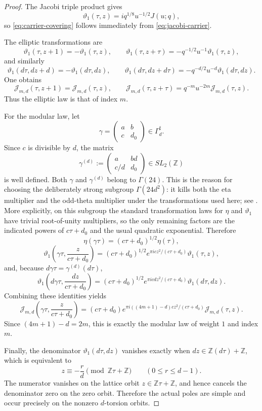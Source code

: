 \documentclass[12pt]{amsart}
\numberwithin{equation}{section}
\newcommand{\ZZ}{\mathbb Z}
\begin{document}
\begin{proof}
The Jacobi triple product gives
\[
\vartheta_1(\tau,z)=i q^{1/8}u^{-1/2}J(u;q),
\]
so \eqref{eq:carrier-covering} follows immediately from \eqref{eq:jacobi-carrier}.

The elliptic transformations are
\[
\vartheta_1(\tau,z+1)=-\vartheta_1(\tau,z),
\qquad
\vartheta_1(\tau,z+\tau)=-q^{-1/2}u^{-1}\vartheta_1(\tau,z),
\]
and similarly
\[
\vartheta_1(d\tau,dz+d)=-\vartheta_1(d\tau,dz),
\qquad
\vartheta_1(d\tau,dz+d\tau)=-q^{-d/2}u^{-d}\vartheta_1(d\tau,dz).
\]
One obtains
\[
\mathcal J_{m,d}(\tau,z+1)=\mathcal J_{m,d}(\tau,z),
\qquad
\mathcal J_{m,d}(\tau,z+\tau)=q^{-m}u^{-2m}\mathcal J_{m,d}(\tau,z).
\]
Thus the elliptic law is that of index $m$.

For the modular law, let
\[
\gamma=\begin{pmatrix}a&b\\ c&d_0\end{pmatrix}\in \Gamma_d^{\sharp}.
\]
Since $c$ is divisible by $d$, the matrix
\[
\gamma^{(d)}:=\begin{pmatrix}a&bd\\ c/d&d_0\end{pmatrix}
\in SL_2(\ZZ)
\]
is well defined.  Both $\gamma$ and $\gamma^{(d)}$ belong to $\Gamma(24)$.  This is the reason for choosing the deliberately strong subgroup $\Gamma(24d^2)$: it kills both the eta multiplier and the odd-theta multiplier under the transformations used here; see \cite[Chapter~1]{EichlerZagier}.  More explicitly, on this subgroup the standard transformation laws for $\eta$ and $\vartheta_1$ have trivial root-of-unity multipliers, so the only remaining factors are the indicated powers of $c\tau+d_0$ and the usual quadratic exponential.  Therefore
\[
\eta(\gamma\tau)=(c\tau+d_0)^{1/2}\eta(\tau),
\]
\[
\vartheta_1\!\left(\gamma\tau,\frac{z}{c\tau+d_0}\right)
=
(c\tau+d_0)^{1/2}e^{\pi i c z^2/(c\tau+d_0)}\vartheta_1(\tau,z),
\]
and, because $d\gamma\tau=\gamma^{(d)}(d\tau)$,
\[
\vartheta_1\!\left(d\gamma\tau,\frac{dz}{c\tau+d_0}\right)
=
(c\tau+d_0)^{1/2}e^{\pi i c d z^2/(c\tau+d_0)}\vartheta_1(d\tau,dz).
\]
Combining these identities yields
\[
\mathcal J_{m,d}\!\left(\gamma\tau,\frac{z}{c\tau+d_0}\right)
=
(c\tau+d_0)e^{\pi i ((4m+1)-d)c z^2/(c\tau+d_0)}\mathcal J_{m,d}(\tau,z).
\]
Since $(4m+1)-d=2m$, this is exactly the modular law of weight $1$ and index $m$.

Finally, the denominator \(\vartheta_1(d\tau,dz)\) vanishes exactly when
\(dz\in \mathbb Z(d\tau)+\mathbb Z\), which is equivalent to
\[
z\equiv -\frac{r}{d}\pmod{\mathbb Z\tau+\mathbb Z}
\qquad (0\le r\le d-1).
\]
The numerator vanishes on the lattice orbit \(z\in\mathbb Z\tau+\mathbb Z\), and hence cancels the denominator zero on the zero orbit. Therefore the actual poles are simple and occur precisely on the nonzero \(d\)-torsion orbits.
\end{proof}
\end{document}
